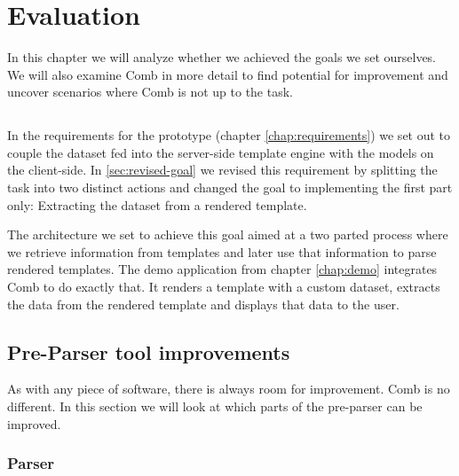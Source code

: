 \documentclass[thesis.tex]{subfiles}
\begin{document}
\chapter{Evaluation}
\label{chap:eval}
In this chapter we will analyze whether we achieved the goals we set ourselves.
We will also examine Comb in more detail to find potential for improvement and
uncover scenarios where Comb is not up to the task.

\section{}
In the requirements for the prototype (chapter \ref{chap:requirements})
we set out to couple the dataset fed into the server-side template engine with
the models on the client-side. In \ref{sec:revised-goal} we revised this
requirement by splitting the task into two distinct actions and changed the goal
to implementing the first part only: Extracting the dataset from a rendered
template.

The architecture we set to achieve this goal aimed at a two parted process where
we retrieve information from templates and later use that information to parse
rendered templates. The demo application from chapter \ref{chap:demo}
integrates Comb to do exactly that. It renders a template with a custom dataset,
extracts the data from the rendered template and displays that data to the user.

\section{Pre-Parser tool improvements}
As with any piece of software, there is always room for improvement.
Comb is no different. In this section we will look at which parts of the
pre-parser can be improved.

\subsection{Parser}
\end{document}
